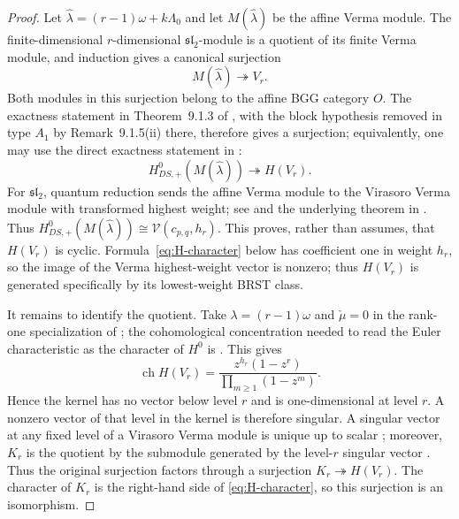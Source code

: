 \documentclass[12pt,leqno]{amsart}
\numberwithin{equation}{section}
\newcommand{\ch}{\operatorname{ch}}
\begin{document}
\begin{proof}
Let $\widehat\lambda=(r-1)\omega+k\Lambda_0$ and let
$M(\widehat\lambda)$ be the affine Verma module.  The finite-dimensional
$r$-dimensional $\mathfrak{sl}_2$-module is a quotient of its finite Verma
module, and induction gives a canonical surjection
\[
 M(\widehat\lambda)\twoheadrightarrow V_r.
\]
Both modules in this surjection belong to the affine BGG category $O$.
The exactness statement in Theorem~9.1.3 of \cite{ArakawaW}, with the block
hypothesis removed in type $A_1$ by Remark~9.1.5(ii) there, therefore gives
a surjection; equivalently, one may use the direct exactness statement in
\cite[Section~4.4, discussion preceding formula~(4.20)]{ArakawaFrenkel}:
\[
 H^0_{DS,+}(M(\widehat\lambda))\twoheadrightarrow H(V_r).
\]
For $\mathfrak{sl}_2$, quantum reduction sends the affine Verma module to
the Virasoro Verma module with transformed highest weight; see
\cite[Section~4.4, especially the discussion preceding formula~(4.20)]
{ArakawaFrenkel} and the underlying theorem in
\cite{ArakawaSuperconformal}.  Thus
$H^0_{DS,+}(M(\widehat\lambda))\cong
\mathcal V(c_{p,q},h_r)$.  This proves, rather than assumes, that $H(V_r)$
is cyclic.  Formula~\eqref{eq:H-character} below has coefficient one in
weight $h_r$, so the image of the Verma highest-weight vector is nonzero;
thus $H(V_r)$ is generated specifically by its lowest-weight BRST class.

It remains to identify the quotient.  Take $\lambda=(r-1)\omega$ and
$\check\mu=0$ in the rank-one specialization of
\cite[formula~(4.19)]{ArakawaFrenkel}; the cohomological concentration needed
to read the Euler characteristic as the character of $H^0$ is
\cite[Theorem~2.1]{ArakawaFrenkel}.  This gives
\begin{equation}\label{eq:H-character}
 \ch H(V_r)=
 \frac{z^{h_r}(1-z^r)}{\prod_{m\geq1}(1-z^m)}.
\end{equation}
Hence the kernel has no vector below level $r$ and is one-dimensional at
level $r$.  A nonzero vector of that level in the kernel is therefore
singular.  A singular vector at any fixed level of a Virasoro Verma module
is unique up to scalar \cite[Proposition~2.2.1(3)]{CreutzigEtAl}; moreover,
$K_r$ is the quotient by the submodule generated by the level-$r$ singular
vector \cite[Remark~2.2]{McRaeSopin}.  Thus the original surjection factors through
a surjection $K_r\twoheadrightarrow H(V_r)$.  The character of $K_r$ is
the right-hand side of \eqref{eq:H-character}, so this surjection is an
isomorphism.
\end{proof}
\end{document}
